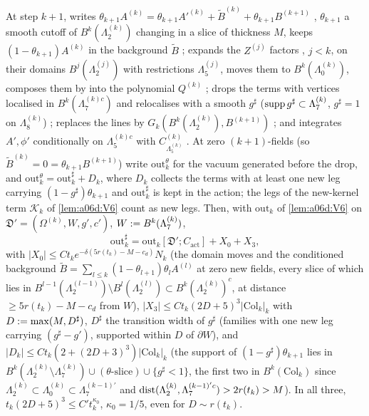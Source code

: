 
\begin{lemma}\label{lem:a06d:K3}
At step $k+1$, \cite{Ba2} writes $\theta_{k+1}A^{(k)}=\theta_{k+1}A'^{(k)}+\tilde B^{(k)}+\theta_{k+1}B^{(k+1)}$ \cite[(2.88)--(2.89)]{Ba2}, $\theta_{k+1}$ a smooth cutoff of $B^k(\Lambda^{(k)}_2)$ changing in a slice of thickness $M$, keeps $(1-\theta_{k+1})A^{(k)}$ in the background $\tilde B$ \cite[p.~579]{Ba2}; expands the $Z^{(j)}$ factors \cite[(2.92)]{Ba2}, $j<k$, on their domains $B^j(\Lambda^{(j)}_2)$ with restrictions $\Lambda^{(j)}_5$, moves them to $B^k(\Lambda^{(k)}_0)$, composes them by \cite[(2.105)]{Ba2} into the polynomial $Q^{(k)}$ \cite[(2.106)]{Ba2}; drops the terms with vertices localised in $B^k(\Lambda^{(k)c}_7)$ and relocalises with a smooth $g^\sharp$ ($\operatorname{supp} g^\sharp\subset\Lambda^{(k)}_7$, $g^\sharp=1$ on $\Lambda^{(k)}_8$) \cite[p.~579]{Ba2}; replaces the lines by $G_k(B^k(\Lambda^{(k)}_2),B^{(k+1)})$ \cite[Prop.~2.6, (2.107)]{Ba2}; and integrates $A',\phi'$ conditionally on $\Lambda^{(k)c}_5$ with $C^{(k)}_{\Lambda^{(k)}_5}$ \cite[(2.115)]{Ba2}. At zero $(k+1)$-fields (so $\tilde B^{(k)}=0=\theta_{k+1}B^{(k+1)}$) write $\mathrm{out}^\theta_k$ for the vacuum generated before the drop, and $\mathrm{out}^\theta_k=\mathrm{out}^\sharp_k+D_k$, where $D_k$ collects the terms with at least one new leg carrying $(1-g^\sharp)\theta_{k+1}$ and $\mathrm{out}^\sharp_k$ is kept in the action; the legs of the new-kernel term $\mathcal K_k$ of \cref{lem:a06d:V6} count as new legs. Then, with $\mathrm{out}_k$ of \cref{lem:a06d:V6} on $\mathfrak D'=(\Omega^{(k)},W,g',c')$, $W:= B^k(\Lambda^{(k)}_7)$,
\[
\mathrm{out}^\sharp_k=\mathrm{out}_k[\mathfrak D';C_{\mathrm{act}}]+X_0+X_3,
\]
with $|X_0|\le Ct_ke^{-\delta(5r(t_k)-M-c_d)}N_k$ (the domain moves and the conditioned background $\tilde B=\sum_{l\le k}(1-\theta_{l+1})\theta_lA^{(l)}$ at zero new fields, every slice of which lies in $B^{l-1}(\Lambda^{(l-1)}_2)\setminus B^l(\Lambda^{(l)}_2)\subset B^k(\Lambda^{(k)}_2)^c$, at distance $\ge5r(t_k)-M-c_d$ from $W$), $|X_3|\le Ct_k(2D+5)^3|\mathrm{Col}_k|_k$ with $D:=\max(M,D^\sharp)$, $D^\sharp$ the transition width of $g^\sharp$ (families with one new leg carrying $(g^\sharp-g')$, supported within $D$ of $\partial W$), and $|D_k|\le Ct_k(2+(2D+3)^3)|\mathrm{Col}_k|_k$ (the support of $(1-g^\sharp)\theta_{k+1}$ lies in $B^k(\Lambda^{(k)}_2\setminus\Lambda^{(k)}_7)\cup(\theta\text{-slice})\cup\{g^\sharp<1\}$, the first two in $B^k(\mathrm{Col}_k)$ since $\Lambda^{(k)}_2\subset\Lambda^{(k)}_0\subset\Lambda^{(k-1)'}_7$ and $\operatorname{dist}(\Lambda^{(k)}_2,\Lambda^{(k-1)'c}_7)>2r(t_k)>M$). In all three, $t_k(2D+5)^3\le C't_k^{\kappa_0}$, $\kappa_0=1/5$, even for $D\sim r(t_k)$.
\end{lemma}

